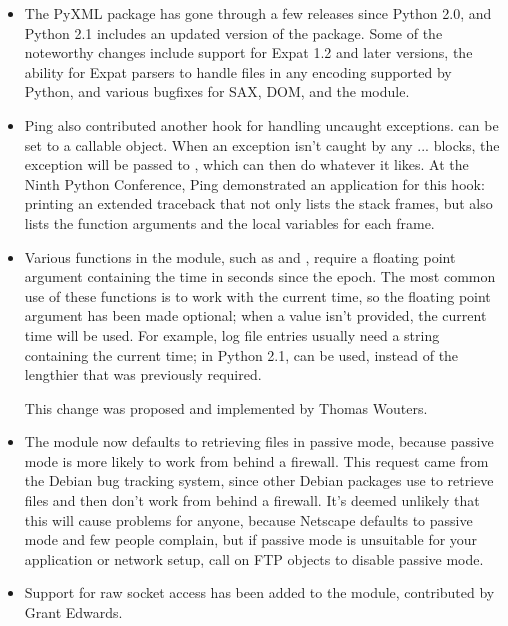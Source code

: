 \documentclass{howto}
\begin{document}
\begin{itemize}
\item The PyXML package has gone through a few releases since Python
2.0, and Python 2.1 includes an updated version of the 
package.  Some of the noteworthy changes include support for Expat 1.2
and later versions, the ability for Expat parsers to handle files in
any encoding supported by Python, and various bugfixes for SAX, DOM,
and the  module.

\item Ping also contributed another hook for handling uncaught
exceptions.   can be set to a callable
object.  When an exception isn't caught by any
... blocks, the exception will be passed
to , which can then do whatever it likes.  At
the Ninth Python Conference, Ping demonstrated an application for this
hook: printing an extended traceback that not only lists the stack
frames, but also lists the function arguments and the local variables
for each frame.  

\item Various functions in the  module, such as
 and , require a floating
point argument containing the time in seconds since the epoch.  The
most common use of these functions is to work with the current time,
so the floating point argument has been made optional; when a value
isn't provided, the current time will be used.  For example, log file
entries usually need a string containing the current time; in Python
2.1,  can be used, instead of the lengthier
 that was previously
required.
 
This change was proposed and implemented by Thomas Wouters.

\item The  module now defaults to retrieving files in
passive mode, because passive mode is more likely to work from behind
a firewall.  This request came from the Debian bug tracking system,
since other Debian packages use  to retrieve files and
then don't work from behind a firewall.  It's deemed unlikely that
this will cause problems for anyone, because Netscape defaults to
passive mode and few people complain, but if passive mode is
unsuitable for your application or network setup, call
 on FTP objects to disable passive mode.

\item Support for raw socket access has been added to the
 module, contributed by Grant Edwards.


\end{itemize}
\end{document}
